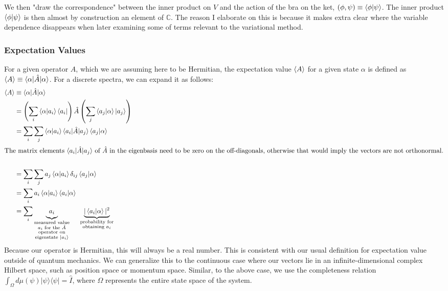 \documentclass[12pt]{article}
\begin{document}
\hspace{1cm} We then "draw the correspondence" between the inner product on $V$ and the action of the bra on the ket, $(\phi, \psi) \equiv \braket{\phi | \psi}$. The inner product $\braket{\phi | \psi}$ is then almost by construction an element of $\mathbb{C}$. The reason I elaborate on this is because it makes extra clear where the variable dependence disappears when later examining some of terms relevant to the variational method. 

\subsubsection{Expectation Values}
\hspace{1cm} For a given operator $A$, which we are assuming here to be Hermitian, the expectation value $\braket{A}$ for a given state $\alpha$ is defined as $\braket{A} \equiv \braket{\alpha | \hat{A} | \alpha}$. For a discrete spectra, we can expand it as follows:
\begin{align*}
    \braket{A} &\equiv \braket{\alpha | \hat{A} | \alpha}\\
    &= \left( \sum_{i} \braket{\alpha | a_i} \bra{a_i} \right) \hat{A} \left( \sum_{j} \braket{a_j | \alpha} \ket{a_j} \right) \\
    &= \sum_{i} \sum_{j} \braket{\alpha | a_i} \braket{a_i | \hat{A} | a_j} \braket{a_j | \alpha} \\
    \intertext{The matrix elements $\braket{a_i | \hat{A} | a_j}$ of $\hat{A}$ in the eigenbasis need to be zero on the off-diagonals, otherwise that would imply the vectors are not orthonormal.}\\
    &= \sum_{i} \sum_{j} a_j \braket{\alpha | a_i} \delta_{i j} \braket{a_j | \alpha} \\
    &= \sum_{i} a_i \braket{\alpha | a_i} \braket{a_i | \alpha} \\
    &= \sum_{i} \underbrace{a_i \vphantom{\big|}}_{\substack{\text{measured value} \\ a_i \text{ for the } \hat{A} \\ \text{ operator on } \\ \text {eigenstate } \ket{a_i} }} \hspace{0.5cm} \underbrace{|\braket{a_i | \alpha}|^2}_{\substack{\text{probability for} \\ \text{obtaining } a_i}} \\
\end{align*}
\hspace{1cm} Because our operator is Hermitian, this will always be a real number. This is consistent with our usual definition for expectation value outside of quantum mechanics. We can generalize this to the continuous case where our vectors lie in an infinite-dimensional complex Hilbert space, such as position space or momentum space. Similar, to the above case, we use the completeness relation $\int_\Omega d\mu(\psi) |\psi\rangle\langle\psi| = \hat{I}$, where $\Omega$ represents the entire state space of the system.
\end{document}
